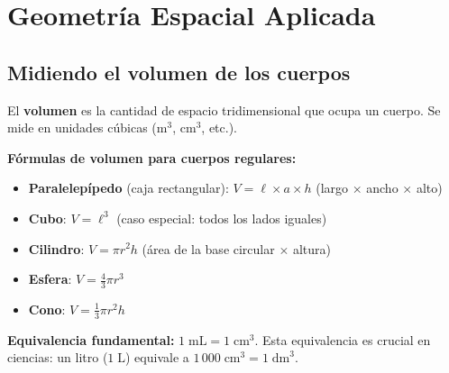 \documentclass[12pt, a4paper]{article}
\begin{document}
\section{Geometría Espacial Aplicada}

\subsection{Midiendo el volumen de los cuerpos}

El \textbf{volumen} es la cantidad de espacio tridimensional que ocupa un cuerpo. Se mide en unidades cúbicas ($\text{m}^3$, $\text{cm}^3$, etc.).

\begin{cuadroteoria}
\textbf{Fórmulas de volumen para cuerpos regulares:}
\begin{itemize}[leftmargin=*]
  \item \textbf{Paralelepípedo} (caja rectangular): $V = \ell \times a \times h$ (largo $\times$ ancho $\times$ alto)
  \item \textbf{Cubo}: $V = \ell^3$ (caso especial: todos los lados iguales)
  \item \textbf{Cilindro}: $V = \pi r^2 h$ (área de la base circular $\times$ altura)
  \item \textbf{Esfera}: $V = \frac{4}{3}\pi r^3$
  \item \textbf{Cono}: $V = \frac{1}{3}\pi r^2 h$
\end{itemize}
\end{cuadroteoria}

\begin{cuadrosolucion}
\textbf{Equivalencia fundamental:} $1\;\text{mL} = 1\;\text{cm}^3$. Esta equivalencia es crucial en ciencias: un litro ($1\;\text{L}$) equivale a $1\,000\;\text{cm}^3 = 1\;\text{dm}^3$.
\end{cuadrosolucion}
\end{document}
